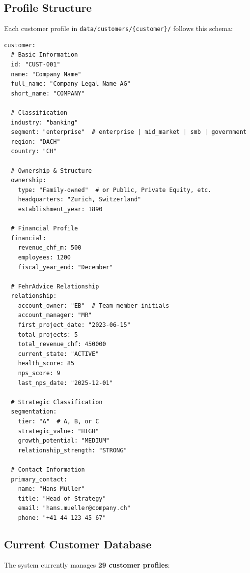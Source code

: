 \subsection{Profile Structure}

Each customer profile in \texttt{data/customers/\{customer\}/} follows this schema:

\begin{verbatim}
customer:
  # Basic Information
  id: "CUST-001"
  name: "Company Name"
  full_name: "Company Legal Name AG"
  short_name: "COMPANY"

  # Classification
  industry: "banking"
  segment: "enterprise"  # enterprise | mid_market | smb | government
  region: "DACH"
  country: "CH"

  # Ownership & Structure
  ownership:
    type: "Family-owned"  # or Public, Private Equity, etc.
    headquarters: "Zurich, Switzerland"
    establishment_year: 1890

  # Financial Profile
  financial:
    revenue_chf_m: 500
    employees: 1200
    fiscal_year_end: "December"

  # FehrAdvice Relationship
  relationship:
    account_owner: "EB"  # Team member initials
    account_manager: "MR"
    first_project_date: "2023-06-15"
    total_projects: 5
    total_revenue_chf: 450000
    current_state: "ACTIVE"
    health_score: 85
    nps_score: 9
    last_nps_date: "2025-12-01"

  # Strategic Classification
  segmentation:
    tier: "A"  # A, B, or C
    strategic_value: "HIGH"
    growth_potential: "MEDIUM"
    relationship_strength: "STRONG"

  # Contact Information
  primary_contact:
    name: "Hans Müller"
    title: "Head of Strategy"
    email: "hans.mueller@company.ch"
    phone: "+41 44 123 45 67"
\end{verbatim}

\subsection{Current Customer Database}

The system currently manages \textbf{29 customer profiles}:

